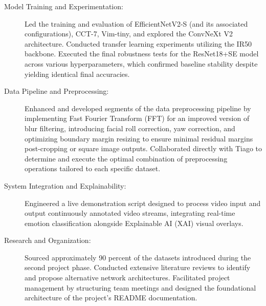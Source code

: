 \begin{description}
    \item[Model Training and Experimentation:] Led the training and evaluation of EfficientNetV2-S (and its associated configurations), CCT-7, Vim-tiny, and explored the ConvNeXt V2 architecture. Conducted transfer learning experiments utilizing the IR50 backbone. Executed the final robustness tests for the ResNet18+SE model across various hyperparameters, which confirmed baseline stability despite yielding identical final accuracies.
    \item[Data Pipeline and Preprocessing:] Enhanced and developed segments of the data preprocessing pipeline by implementing Fast Fourier Transform (FFT) for an improved version of blur filtering, introducing facial roll correction, yaw correction, and optimizing boundary margin resizing to ensure minimal residual margins post-cropping or square image outputs. Collaborated directly with Tiago to determine and execute the optimal combination of preprocessing operations tailored to each specific dataset.
    \item[System Integration and Explainability:] Engineered a live demonstration script designed to process video input and output continuously annotated video streams, integrating real-time emotion classification alongside Explainable AI (XAI) visual overlays.
    \item[Research and Organization:] Sourced approximately 90 percent of the datasets introduced during the second project phase. Conducted extensive literature reviews to identify and propose alternative network architectures. Facilitated project management by structuring team meetings and designed the foundational architecture of the project's README documentation.
\end{description}
